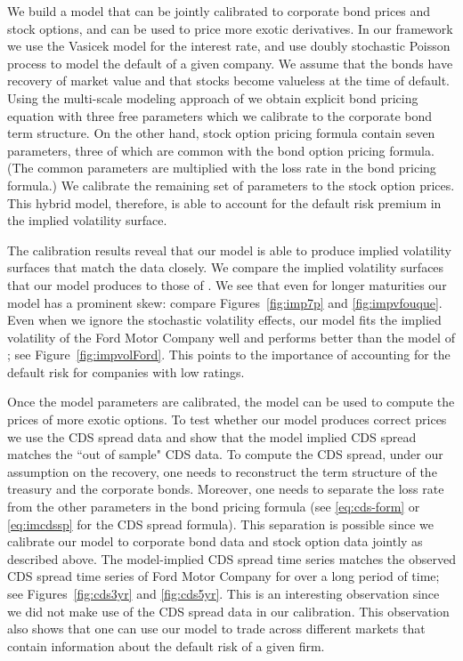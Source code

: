 \documentclass[11pt]{article}
\numberwithin{equation}{section}
\begin{document}
We build a model that can be jointly calibrated to corporate bond prices and stock options, and can be used to price more exotic derivatives. In our framework we use the Vasicek model for the interest rate, and use doubly stochastic Poisson process to model the default of a given company. We assume that the bonds have recovery of market value and that stocks become valueless at the time of default.
Using the multi-scale modeling approach of \cite{ronnie-timescale}  we obtain explicit bond pricing equation with three free parameters which we calibrate to the corporate bond term structure. On the other hand, stock option pricing formula contain seven parameters, three of which are common with the bond option pricing formula. (The common parameters are multiplied with the loss rate in the bond pricing formula.) 
We calibrate the remaining set of parameters to the stock option prices. This hybrid model, therefore, is able to account for the default risk premium in the implied volatility surface.

The calibration results reveal that our model is able to produce implied volatility surfaces that match the data closely.
 We compare the implied volatility surfaces that our model produces to those of \cite{ronnie-timescale}. We see that even for longer maturities our model has a prominent skew: compare  Figures~\ref{fig:imp7p} and \ref{fig:impvfouque}. Even when we ignore the stochastic volatility effects, our model fits the implied volatility of the Ford Motor Company well and performs better than the model of \cite{ronnie-timescale}; see Figure~\ref{fig:impvolFord}. This points to the importance of accounting for the default risk for companies with low ratings. 

Once the model parameters are calibrated, the model can be used to compute the prices of more exotic options.
To test whether our model produces correct prices we use the CDS spread data and show that the model implied CDS spread matches the ``out of sample" CDS data.
To compute the CDS spread, under our assumption on the recovery, one needs to reconstruct the term structure of the treasury and the corporate bonds. Moreover, one needs to separate the loss rate from the other parameters in the bond pricing formula (see \eqref{eq:cds-form} or \eqref{eq:imcdssp} for the CDS spread formula). This separation is possible since we calibrate our model to corporate bond data and stock option data jointly as described above.  The model-implied CDS spread 
time series matches the observed CDS spread time series of Ford Motor Company for over a long period of time; see Figures~\ref{fig:cds3yr} and \ref{fig:cds5yr}. This is an interesting observation since we did not make use of the CDS spread data in our calibration. This observation also shows that one can use our model to trade across different markets that contain information about the default risk of a given firm.
\end{document}
